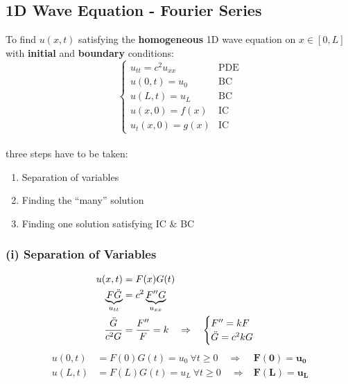 \subsection{1D Wave Equation - Fourier Series}\label{ssec:1d_wave_FS}
To find $u(x,t)$ satisfying the \textbf{homogeneous} 1D wave equation on $x\in[0,L]$ with \textbf{initial} and
\textbf{boundary} conditions:
\begin{equation*}
    \begin{cases}
        u_{tt}=c^2u_{xx} & \text{PDE} \\
        u(0,t)=u_0       & \text{BC}  \\
        u(L,t)=u_L       & \text{BC}  \\
        u(x,0)=f(x)      & \text{IC}  \\
        u_t(x,0)=g(x)    & \text{IC}
    \end{cases}
\end{equation*}\\
three steps have to be taken:
\begin{enumerate}[label=\roman*]
    \item Separation of variables
    \item Finding the ``many'' solution
    \item Finding one solution satisfying IC \& BC
\end{enumerate}

\subsubsection{(i) Separation of Variables}
\begin{align*}
    u(x,t)                          & =F(x)G(t)                                               \\
    \underbrace{F\ddot{G}}_{u_{tt}} & =c^2\underbrace{F''G}_{u_{xx}}                          \\
    \frac{\ddot{G}}{c^2G}           & =\frac{F''}{F}=k\hspace*{10pt}\Rightarrow\hspace*{10pt}
    \begin{cases}
        F''=kF \\
        \ddot{G}=c^2kG
    \end{cases}
\end{align*}
\begin{align*}
    u(0,t) & =F(0)G(t)=u_0\mathrm{~}\forall t\geq0\quad\Rightarrow & \mathbf{F(0)}=\mathbf{u_0} \\
    u(L,t) & =F(L)G(t)=u_L\mathrm{~}\forall t\geq0\quad\Rightarrow & \mathbf{F(L)}=\mathbf{u_L}
\end{align*}

